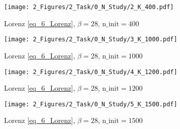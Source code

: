 \begin{figure}[!h]
    \begin{minipage}[h]{0.47\textwidth}
        \centering
        \texttt{[image: 2\_Figures/2\_Task/0\_N\_Study/2\_K\_400.pdf]}
        \caption{Lorenz \eqref{eq_6_Lorenz}, $\beta =28$, $\text{n\_init}= 400$}
        \label{fig_17}    
    \end{minipage}
    \hfill
    \begin{minipage}{0.47\textwidth}
        \centering
        \texttt{[image: 2\_Figures/2\_Task/0\_N\_Study/3\_K\_1000.pdf]}
        \caption{Lorenz \eqref{eq_6_Lorenz}, $\beta =28$, $\text{n\_init}= 1000$}
        \label{fig_18}    
    \end{minipage}
\end{figure}

\begin{figure}[!h]
    \begin{minipage}[h]{0.47\textwidth}
        \centering
        \texttt{[image: 2\_Figures/2\_Task/0\_N\_Study/4\_K\_1200.pdf]}
        \caption{Lorenz \eqref{eq_6_Lorenz}, $\beta =28$, $\text{n\_init}= 1200$}
        \label{fig_19}    
    \end{minipage}
    \hfill
    \begin{minipage}{0.47\textwidth}
        \centering
        \texttt{[image: 2\_Figures/2\_Task/0\_N\_Study/5\_K\_1500.pdf]}
        \caption{Lorenz \eqref{eq_6_Lorenz}, $\beta =28$, $\text{n\_init}= 1500$}
        \label{fig_20}    
    \end{minipage}
\end{figure} 

